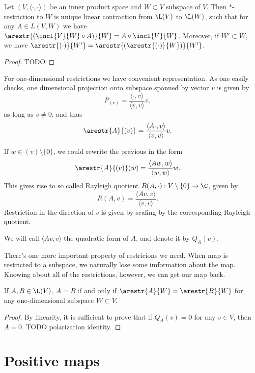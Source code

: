 \begin{lause}
	Let $(V, \langle \cdot, \cdot \rangle)$ be an inner product space and $W \subset V$ subspace of $V$. Then $*$-restriction to $W$ is unique linear contraction from $\L(V)$ to $\L(W)$, such that for any $A \in L(V, W)$ we have $\arestr{(\incl{V}{W} \circ A)}{W} = A \circ \incl{V}{W}$. Moreover, if $W' \subset W$, we have $\arestr{(\cdot)}{W'} = \arestr{(\arestr{(\cdot)}{W})}{W'}$.
\end{lause}
\begin{proof}
	TODO
\end{proof}

For one-dimensional restrictions we have convenient representation. As one easily checks, one dimensional projection onto subspace spanned by vector $v$ is given by
\[
	P_{(v)} = \frac{\langle \cdot, v \rangle}{\langle v, v \rangle} v,
\]
as long as $v \neq 0$, and thus
\[
	\arestr{A}{(v)} = \frac{\langle A \cdot, v \rangle}{\langle v, v \rangle} v.
\]

If $w \in (v) \setminus \{0\}$, we could rewrite the previous in the form
\[
	\arestr{A}{(v)}(w) = \frac{\langle A w, w\rangle}{\langle w, w \rangle} w.
\]
This gives rise to so called Rayleigh quotient $R(A, \cdot) : V \setminus \{0\} \to \C$, given by
\[
	R(A, v) = \frac{\langle A v, v \rangle}{\langle v, v \rangle}.
\]
Restriction in the direction of $v$ is given by scaling by the corresponding Rayleigh quotient.

We will call $\langle A v, v \rangle$ the quadratic form of $A$, and denote it by $Q_{A}(v)$.

There's one more important property of restricions we need. When map is restricted to a subspace, we naturally lose some imformation about the map. Knowing about all of the restrictions, however, we can get our map back.

\begin{lem}
	If $A, B \in \L(V)$, $A = B$ if and only if $\arestr{A}{W} = \arestr{B}{W}$ for any one-dimensional subspace $W \subset V$.
\end{lem} 
\begin{proof}
	By linearity, it is sufficient to prove that if $Q_{A}(v) = 0$ for any $v \in V$, then $A = 0$. TODO polarization identity.
\end{proof}

\section{Positive maps}

